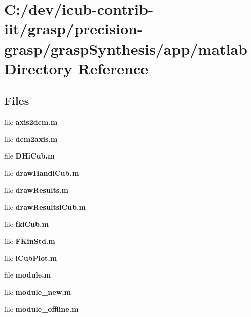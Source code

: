 \section{C\+:/dev/icub-\/contrib-\/iit/grasp/precision-\/grasp/grasp\+Synthesis/app/matlab Directory Reference}
\label{dir_612017fa4f4163be5376787ce7e7dfb4}
\subsection*{Files}
\begin{DoxyCompactItemize}
\item 
file {\bfseries axis2dcm.\+m}
\item 
file {\bfseries dcm2axis.\+m}
\item 
file {\bfseries D\+Hi\+Cub.\+m}
\item 
file {\bfseries draw\+Handi\+Cub.\+m}
\item 
file {\bfseries draw\+Results.\+m}
\item 
file {\bfseries draw\+Resultsi\+Cub.\+m}
\item 
file {\bfseries fki\+Cub.\+m}
\item 
file {\bfseries F\+Kin\+Std.\+m}
\item 
file {\bfseries i\+Cub\+Plot.\+m}
\item 
file {\bfseries module.\+m}
\item 
file {\bfseries module\+\_\+new.\+m}
\item 
file {\bfseries module\+\_\+offline.\+m}
\end{DoxyCompactItemize}
